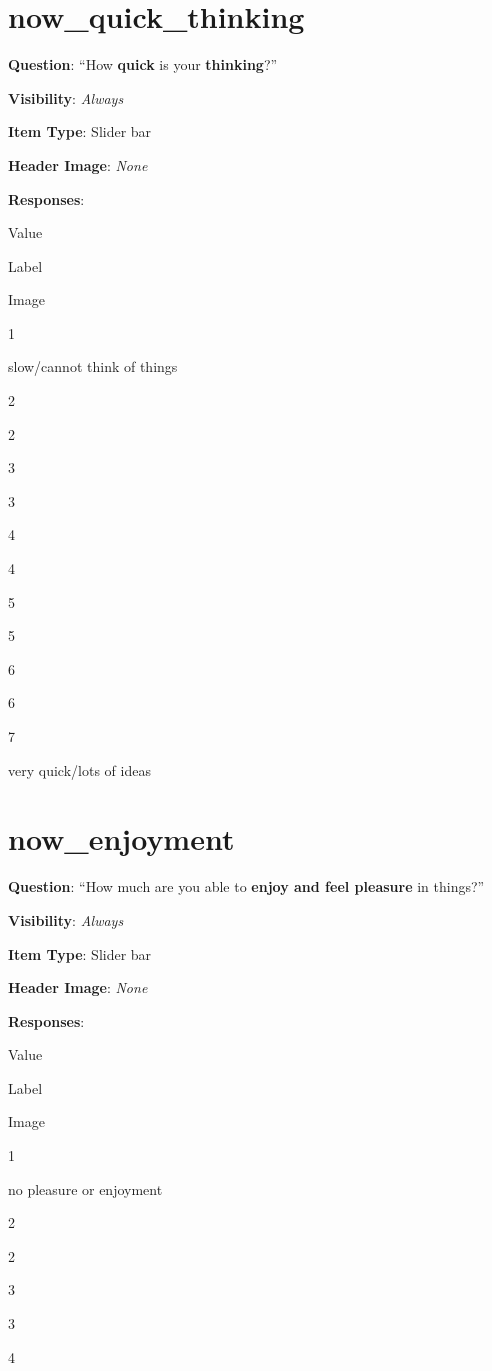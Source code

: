 \documentclass[]{book}
\begin{document}
\hypertarget{now_quick_thinking}{%
\section{now\_quick\_thinking}\label{now_quick_thinking}}

\textbf{Question}: ``How \textbf{quick} is your \textbf{thinking}?''

\textbf{Visibility}: \emph{Always}

\textbf{Item Type}: Slider bar

\textbf{Header Image}: \emph{None}

\textbf{Responses}:

Value

Label

Image

1

slow/cannot think of things

2

2

3

3

4

4

5

5

6

6

7

very quick/lots of ideas

\hypertarget{now_enjoyment}{%
\section{now\_enjoyment}\label{now_enjoyment}}

\textbf{Question}: ``How much are you able to \textbf{enjoy and feel pleasure} in things?''

\textbf{Visibility}: \emph{Always}

\textbf{Item Type}: Slider bar

\textbf{Header Image}: \emph{None}

\textbf{Responses}:

Value

Label

Image

1

no pleasure or enjoyment

2

2

3

3

4
\end{document}

